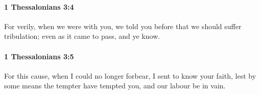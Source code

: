 		\paragraph{1 Thessalonians 3:4} %
			\label{1THESSALONIANS-3-4}

			For verily, when we were with you, we told you before that we should suffer tribulation; even as it came to pass, and ye know.

			\begin{framed}
			\scriptsize
				\begin{compactdesc}
					\item[SBLG] 
				\end{compactdesc}
			\end{framed}

		\paragraph{1 Thessalonians 3:5} %
			\label{1THESSALONIANS-3-5}

			For this cause, when I could no longer forbear, I sent to know your faith, lest by some means the tempter have tempted you, and our labour be in vain.


